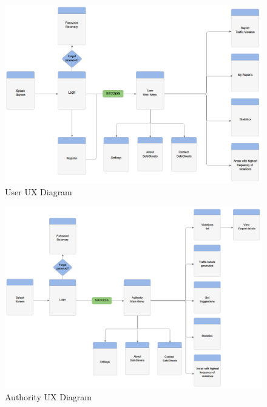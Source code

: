  \begin{figure}[H]
          \includegraphics[width=1.25\textwidth,left]{Images/user_experience.png}
        \caption{User UX Diagram}
    \end{figure}
     \begin{figure}[H]
          \includegraphics[width=1.25\textwidth,left]{Images/auth_experience.png}
        \caption{Authority UX Diagram}
    \end{figure}
    
   